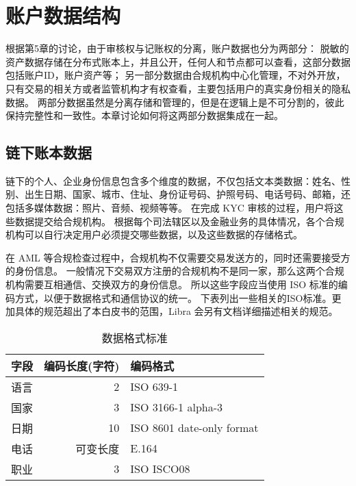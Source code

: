 \section{账户数据结构}\label{sec:account_structure}

根据第5章的讨论，由于审核权与记账权的分离，账户数据也分为两部分：
脱敏的资产数据存储在分布式账本上，并且公开，任何人和节点都可以查看，这部分数据包括账户ID，账户资产等；
另一部分数据由合规机构中心化管理，不对外开放，只有交易的相关方或者监管机构才有权查看，主要包括用户的真实身份相关的隐私数据。
两部分数据虽然是分离存储和管理的，但是在逻辑上是不可分割的，彼此保持完整性和一致性。本章讨论如何将这两部分数据集成在一起。

\subsection{链下账本数据}
链下的个人、企业身份信息包含多个维度的数据，不仅包括文本类数据：姓名、性别、出生日期、国家、城市、住址、身份证号码、护照号码、电话号码、邮箱，还包括多媒体数据：照片、音频、视频等等。
在完成 KYC 审核的过程，用户将这些数据提交给合规机构。
根据每个司法辖区以及金融业务的具体情况，各个合规机构可以自行决定用户必须提交哪些数据，以及这些数据的存储格式。

在 AML 等合规检查过程中，合规机构不仅需要交易发送方的，同时还需要接受方的身份信息。
一般情况下交易双方注册的合规机构不是同一家，那么这两个合规机构需要互相通信、交换双方的身份信息。
所以这些字段应当使用 ISO 标准的编码方式，以便于数据格式和通信协议的统一。
下表列出一些相关的ISO标准。更加具体的规范超出了本白皮书的范围，Libra 会另有文档详细描述相关的规范。

\begin{table}[h!]
    \caption{数据格式标准} 
    \label{tab:data_format}
    \small %
    \centering %
    \begin{tabular}{|l|r|l|} %
        \toprule[\heavyrulewidth]\toprule[\heavyrulewidth]
        \textbf{字段} & \textbf{编码长度(字符)} & \textbf{编码格式} \\ 
        \hline
        语言 & 2 & ISO 639-1 \\
        国家 & 3 & ISO 3166-1 alpha-3 \\
        日期 & 10 & ISO 8601 date-only format \\
        电话 & 可变长度 & E.164 \\
        职业 & 3 & ISO ISCO08 \\
        \bottomrule[\heavyrulewidth] 
    \end{tabular}
\end{table}

